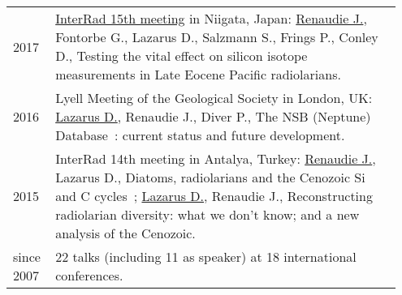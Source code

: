 \documentclass[11pt, a4paper]{article}
\begin{document}
\begin{longtable}{p{0.1\linewidth} P{0.85\linewidth}}
2017 & \href{http://interrad2017.random-walk.org/wp-content/uploads/2017/10/Abstracts_InterRadXV_171016b.pdf}{InterRad 15th meeting} in Niigata, Japan: \underline{Renaudie J.}, Fontorbe G., Lazarus D., Salzmann S., Frings P., Conley D., Testing the vital effect on silicon isotope measurements in Late Eocene Pacific radiolarians.\\
2016 & Lyell Meeting of the Geological Society in London, UK: \underline{Lazarus D.}, Renaudie J., Diver P., The NSB (Neptune) Database : current status and future development.\\
2015 & InterRad 14th meeting in Antalya, Turkey: \underline{Renaudie J.}, Lazarus D., Diatoms, radiolarians and the Cenozoic Si and C cycles ; \underline{Lazarus D.}, Renaudie J., Reconstructing radiolarian diversity: what we don't know; and a new analysis of the Cenozoic.\\
since 2007 & 22 talks (including 11 as speaker) at 18 international conferences.
\end{longtable}
\end{document}

